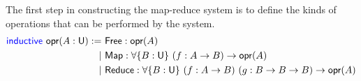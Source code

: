 The first step in constructing the map-reduce system is to define the kinds of operations
that can be performed by the system.
\begingroup
\small
\addtolength{\jot}{-0.2em}
\begin{align*}
  \textsf{\color{blue}inductive}\ \textsf{opr}(A : \textsf{U}) :=\ &\textsf{Free}  : \textsf{opr}(A) \\
  \mid\ &\textsf{Map}   : \forall \{B : \textsf{U}\}\ (f : A \rightarrow B) \rightarrow \textsf{opr}(A) \\
  \mid\ &\textsf{Reduce}: \forall \{B : \textsf{U}\}\ (f : A \rightarrow B)\ (g : B \rightarrow B \rightarrow B) \rightarrow \textsf{opr}(A)
\end{align*}
\endgroup

